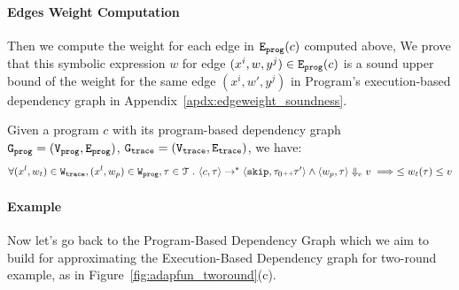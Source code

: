 \paragraph{Edges Weight Computation}
Then we compute the weight for each edge in $\mathtt{{E_{prog}}}(c)$ computed above,
\highlight{
 \[
   \progE(c) \triangleq
   \left\{ (x^i, w, y^j) 
\mid
(x^i, w, y^j) \in \progE^0(c) \land 
w = \max\limits_{\absevent = (i, \_, j)} \{ \absclr(\absevent)\} 
\right\}.
\]
}
%
We prove that this 
symbolic expression $w$ for edge $(x^i, w, y^j) \in \mathtt{{E_{prog}}}(c)$
 is a sound upper bound of 
the weight for the same edge $(x^i, w', y^j)$ in Program's execution-based dependency graph in Appendix~\ref{apdx:edgeweight_soundness}.
%
\begin{thm}
  \label{thm:edgeweight_soundness}
Given a program ${c}$ with its program-based dependency graph 
$\mathtt{{G_{prog}}} = (\mathtt{{V_{prog}}}, \mathtt{{E_{prog}}})$,
$\mathtt{{G_{trace}}} = (\mathtt{{V_{trace}}}, \mathtt{{E_{trace}}})$, we have:
%
\[
\forall (x^l, w_{t}) \in \mathtt{{W_{trace}}},
(x^l, w_{p}) \in \mathtt{{W_{prog}}}, \mathtt{\tau} \in \mathcal{T} ~.~
\langle {c}, \mathtt{\tau} \rangle \to^{*} \langle \mathtt{skip}, \mathtt{\tau}_0 {\scriptscriptstyle ++} \mathtt{\tau}' \rangle 
\land 
\langle w_{p}, \mathtt{\tau} \rangle \Downarrow_e v
\implies
\leq 
w_{t}(\mathtt{\tau}) \leq v
\]
\end{thm}
\paragraph*{Example}
Now let's 
go back to the Program-Based Dependency Graph which we aim to build for approximating the 
Execution-Based Dependency graph for two-round example, as in
Figure~\ref{fig:adapfun_tworound}(c).
%
%
